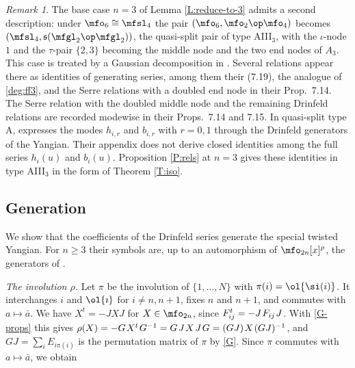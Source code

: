 \documentclass{amsart}
\numberwithin{equation}{section}
\theoremstyle{remark}
\newtheorem{remark}[theorem]{Remark}
\renewcommand{\,}{\kern 0.1em} %
\begin{document}
\begin{remark} \label{R:AIII}
%
The base case $n=3$ of Lemma \ref{L:reduce-to-3} admits a second description: under
$\mfo_6\cong\mfsl_4$ the pair $(\mfo_6,\mfo_2\op\mfo_4)$ becomes
$(\mfsl_4,\mathfrak{s}(\mfgl_2\op\mfgl_2))$, the quasi-split pair of type AIII$_3$, with the
$\iota$-node $1$ and the $\tau$-pair $\{2,3\}$ becoming the middle node and the two end nodes of
$A_3$. This case is treated by a Gaussian decomposition in \cite[\S7.3]{LZ25}. Several
relations appear there as identities of generating series, among them their (7.19), the
analogue of \eqref{deg:ff3}, and the Serre relations with a doubled end node in their
Prop.~7.14. The Serre relation with the doubled middle node and the remaining Drinfeld relations
are recorded modewise in their Props.~7.14 and 7.15. In quasi-split type A, \cite[App.~B]{HL26} expresses the modes $h_{i,r}$ and $b_{i,r}$ with $r=0,1$
through the Drinfeld generators of the Yangian. Their appendix does not derive closed identities
among the full series $h_i(u)$ and $b_i(u)$. Proposition \ref{P:rels} at $n=3$ gives these identities
in type AIII$_3$ in the form of Theorem \ref{T:iso}.
%
\end{remark}


\subsection{Generation} \label{sec:gen-lem}

We show that the coefficients of the Drinfeld series generate the special twisted Yangian. For
$n\ge3$ their symbols are, up to an automorphism of $\mfo_{2n}[x]^\rho$, the generators of
\cite[Prop.~2.5]{LZ25}.

\smallskip

{\it The involution $\rho$.} Let $\pi$ be the involution of $\{1,\ldots,N\}$ with
$\pi(i)=\ol{\si(i)}$. It interchanges $i$ and $\ol{\imath}$ for $i\ne n,n+1$, fixes $n$ and
$n+1$, and commutes with $a\mapsto\bar{a}$. We have $X^t = -JXJ$ for $X\in\mfo_{2n}$, since
$F^t_{ij} = -J\,F_{ij}\,J$. With \eqref{G-props} this gives
$\rho(X) = -G\,X^t\,G^{-1} = G\,J\,X\,J\,G = (GJ)\,X\,(GJ)^{-1}$, and $GJ = \sum_i E_{i\pi(i)}$ is
the permutation matrix of $\pi$ by \eqref{G}. Since $\pi$ commutes with $a\mapsto\bar{a}$, we obtain
%

\smallskip
\end{document}
